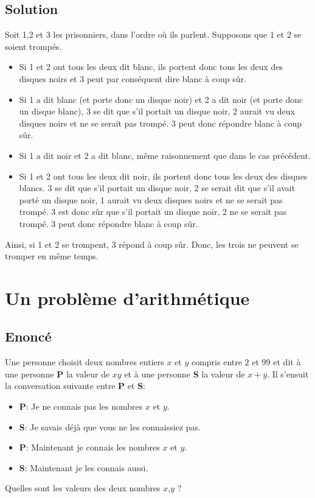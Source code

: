 \documentclass{article}
\begin{document}
\subsection{Solution}
Soit 1,2 et 3 les prisonniers, dans l'ordre où ils parlent. Supposons que 1 et 2 se soient trompés.
\begin{itemize}
\item
Si 1 et 2 ont tous les deux dit blanc, ils portent donc tous les deux des disques noirs et 3 peut par conséquent dire blanc à coup sûr.
\item
Si 1 a dit blanc (et porte donc un disque noir) et 2 a dit noir (et porte donc un disque blanc), 3 se dit que s'il portait un disque noir, 2 aurait vu deux disques noirs et ne se serait pas trompé. 3 peut donc répondre blanc à coup sûr.
\item
Si 1 a dit noir et 2 a dit blanc, même raisonnement que dans le cas précédent.
\item
Si 1 et 2 ont tous les deux dit noir, ils portent donc tous les deux des disques blancs. 3 se dit que s'il portait un disque noir, 2 se serait dit que s'il avait porté un disque noir, 1 aurait vu deux disques noirs et ne se serait pas trompé. 3 est donc sûr que s'il portait un disque noir, 2 ne se serait pas trompé. 3 peut donc répondre blanc à coup sûr.
\end{itemize}
Ainsi, si 1 et 2 se trompent, 3 répond à coup sûr. Donc, les trois ne peuvent se tromper en même temps.
\pagebreak

\section{Un problème d'arithmétique}

\subsection{Enoncé}
Une personne choisit deux nombres entiers $x$ et $y$ compris entre $2$ et $99$ et dit à une personne {\bf P} la valeur de $xy$ et à une personne {\bf S} la valeur de $x+y$. Il s'ensuit la conversation suivante entre {\bf P} et {\bf S}:
\begin{itemize}
\item {\bf P}: Je ne connais pas les nombres $x$ et $y$.
\item {\bf S}: Je savais déjà que vous ne les connaissiez pas.
\item {\bf P}: Maintenant je connais les nombres $x$ et $y$.
\item {\bf S}: Maintenant je les connais aussi.
\end{itemize}
Quelles sont les valeurs des deux nombres $x$,$y$ ?
\end{document}
